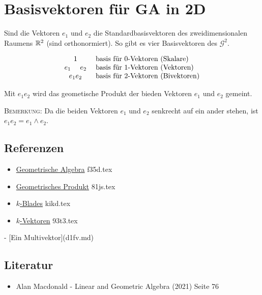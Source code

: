 \documentclass{sajzk}
\begin{document}
\section{Basisvektoren für GA in 2D}
\label{e6nk}

Sind die Vektoren $e_1$ und $e_2$ die Standardbasisvektoren des
zweidimensionalen Raumens $\mathbb{R}^2$ (sind orthonormiert). So gibt es vier
Basisvektoren des $\mathscr{G}^2$.

\[
\begin{matrix}
    1 \\ 
    e_1\hspace{3ex} e_2 \\ 
    e_1e_2
\end{matrix}
\hspace{3ex}
\begin{matrix*}[l]
    \textrm{basis für }0\textrm{-Vektoren (Skalare)} \\ 
    \textrm{basis für }1\textrm{-Vektoren (Vektoren)} \\ 
    \textrm{basis für }2\textrm{-Vektoren (Bivektoren)} \\ 
\end{matrix*}
\]

Mit $e_1e_2$ wird das geometische Produkt der bieden Vektoren $e_1$ und $e_2$
gemeint.

\textsc{Bemerkung:} Da die beiden Vektoren $e_1$ und $e_2$ senkrecht auf ein ander
stehen, ist $e_1e_2 = e_1\wedge e_2$.

\subsection{Referenzen}
\begin{itemize}
    \item \href{f35d.pdf}{Geometrische Algebra} f35d.tex
    \item \href{81js.pdf}{Geometrisches Produkt} 81js.tex
    \item \href{kikd.pdf}{$k$-Blades} kikd.tex
    \item \href{93t3.pdf}{$k$-Vektoren} 93t3.tex
\end{itemize}

- [Ein Multivektor](d1fv.md)

\subsection{Literatur}
\begin{itemize}
    \item Alan Macdonald - Linear and Geometric Algebra (2021) Seite 76
\end{itemize}
\end{document}
